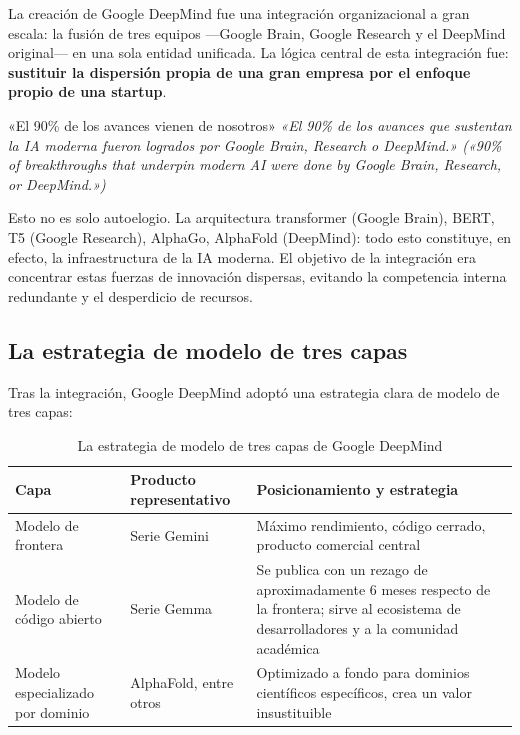 \documentclass[a4paper]{article}
\begin{document}
La creación de Google DeepMind fue una integración organizacional a gran escala: la fusión de tres equipos —Google Brain, Google Research y el DeepMind original— en una sola entidad unificada. La lógica central de esta integración fue: \textbf{sustituir la dispersión propia de una gran empresa por el enfoque propio de una startup}.

\begin{importantbox}{«El 90\% de los avances vienen de nosotros»}
\textit{«El 90\% de los avances que sustentan la IA moderna fueron logrados por Google Brain, Research o DeepMind.» («90\% of breakthroughs that underpin modern AI were done by Google Brain, Research, or DeepMind.»)}

Esto no es solo autoelogio. La arquitectura transformer (Google Brain), BERT, T5 (Google Research), AlphaGo, AlphaFold (DeepMind): todo esto constituye, en efecto, la infraestructura de la IA moderna. El objetivo de la integración era concentrar estas fuerzas de innovación dispersas, evitando la competencia interna redundante y el desperdicio de recursos.
\end{importantbox}

\subsection{La estrategia de modelo de tres capas}

Tras la integración, Google DeepMind adoptó una estrategia clara de modelo de tres capas:

\begin{table}[H]
\centering
\begin{tabular}{p{} p{} p{}}
\toprule
\textbf{Capa} & \textbf{Producto representativo} & \textbf{Posicionamiento y estrategia} \\
\midrule
Modelo de frontera & Serie Gemini & Máximo rendimiento, código cerrado, producto comercial central \\
Modelo de código abierto & Serie Gemma & Se publica con un rezago de aproximadamente 6 meses respecto de la frontera; sirve al ecosistema de desarrolladores y a la comunidad académica \\
Modelo especializado por dominio & AlphaFold, entre otros & Optimizado a fondo para dominios científicos específicos, crea un valor insustituible \\
\bottomrule
\end{tabular}
\caption{La estrategia de modelo de tres capas de Google DeepMind}
\end{table}
\end{document}
